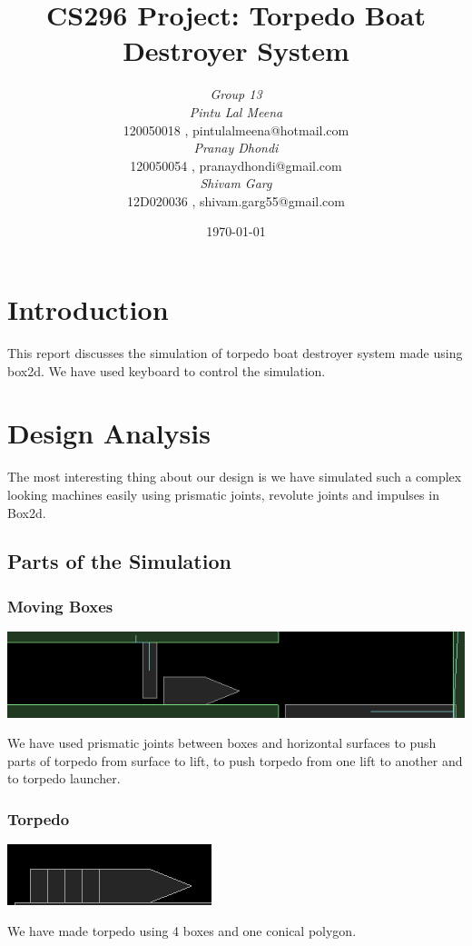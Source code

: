 \documentclass[11pt]{article}
\begin{document}
\nocite{*}


\title {CS296 Project: Torpedo Boat Destroyer System}
\author {\emph{Group 13} \\
	\emph{Pintu Lal Meena} \\
	 \textrm{120050018} ,  \textsf{pintulalmeena@hotmail.com} \\
	\emph{Pranay Dhondi } \\
	\textrm{120050054} , \textsf{pranaydhondi@gmail.com} \\
	\emph{Shivam Garg}\\
	\textrm{12D020036} , \textsf{shivam.garg55@gmail.com}}
\date{\today} 
\maketitle
\section{Introduction}
This report discusses the simulation of torpedo boat destroyer system made using box2d.  We have used keyboard to control the simulation. 
\section{Design Analysis}
The most interesting thing about our design is we have simulated such a complex looking 
machines easily using prismatic joints, revolute joints and impulses in Box2d.
\subsection{Parts of the Simulation}
\subsubsection{Moving Boxes}
 \begin{center}
 \includegraphics[scale=0.5]{images/push}
 \end{center}
We have used prismatic joints between boxes and horizontal surfaces to push parts of torpedo from surface to lift, to push torpedo from one lift to
another and to torpedo launcher.
\subsubsection{Torpedo}
\begin{center}
 \includegraphics[scale=0.5]{images/torpedo}
 \end{center}
We have made torpedo using 4 boxes and one conical polygon.
\end{document}
